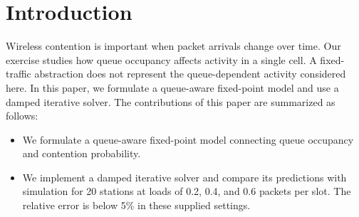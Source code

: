 \section{Introduction}\label{sec:intro}
Wireless contention is important when packet arrivals change over time.
Our exercise studies how queue occupancy affects activity in a single cell.
A fixed-traffic abstraction does not represent the queue-dependent activity considered here.
In this paper, we formulate a queue-aware fixed-point model and use a damped iterative solver.
The contributions of this paper are summarized as follows:
\begin{itemize}
\item We formulate a queue-aware fixed-point model connecting queue occupancy and contention probability.
\item We implement a damped iterative solver and compare its predictions with simulation for 20 stations at loads of 0.2, 0.4, and 0.6 packets per slot. The relative error is below 5\% in these supplied settings.
\end{itemize}
